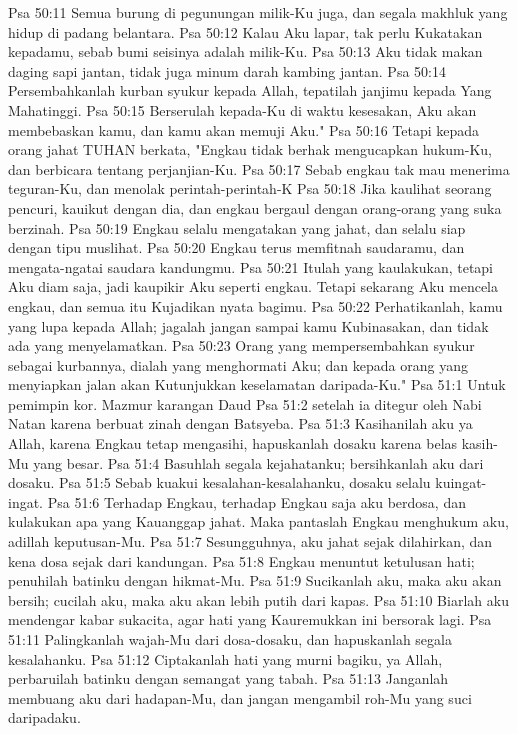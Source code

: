 Psa 50:11  Semua burung di pegunungan milik-Ku juga, dan segala makhluk yang hidup di padang belantara.
Psa 50:12  Kalau Aku lapar, tak perlu Kukatakan kepadamu, sebab bumi seisinya adalah milik-Ku.
Psa 50:13  Aku tidak makan daging sapi jantan, tidak juga minum darah kambing jantan.
Psa 50:14  Persembahkanlah kurban syukur kepada Allah, tepatilah janjimu kepada Yang Mahatinggi.
Psa 50:15  Berserulah kepada-Ku di waktu kesesakan, Aku akan membebaskan kamu, dan kamu akan memuji Aku."
Psa 50:16  Tetapi kepada orang jahat TUHAN berkata, "Engkau tidak berhak mengucapkan hukum-Ku, dan berbicara tentang perjanjian-Ku.
Psa 50:17  Sebab engkau tak mau menerima teguran-Ku, dan menolak perintah-perintah-K
Psa 50:18  Jika kaulihat seorang pencuri, kauikut dengan dia, dan engkau bergaul dengan orang-orang yang suka berzinah.
Psa 50:19  Engkau selalu mengatakan yang jahat, dan selalu siap dengan tipu muslihat.
Psa 50:20  Engkau terus memfitnah saudaramu, dan mengata-ngatai saudara kandungmu.
Psa 50:21  Itulah yang kaulakukan, tetapi Aku diam saja, jadi kaupikir Aku seperti engkau. Tetapi sekarang Aku mencela engkau, dan semua itu Kujadikan nyata bagimu.
Psa 50:22  Perhatikanlah, kamu yang lupa kepada Allah; jagalah jangan sampai kamu Kubinasakan, dan tidak ada yang menyelamatkan.
Psa 50:23  Orang yang mempersembahkan syukur sebagai kurbannya, dialah yang menghormati Aku; dan kepada orang yang menyiapkan jalan akan Kutunjukkan keselamatan daripada-Ku."
Psa 51:1  Untuk pemimpin kor. Mazmur karangan Daud
Psa 51:2  setelah ia ditegur oleh Nabi Natan karena berbuat zinah dengan Batsyeba.
Psa 51:3  Kasihanilah aku ya Allah, karena Engkau tetap mengasihi, hapuskanlah dosaku karena belas kasih-Mu yang besar.
Psa 51:4  Basuhlah segala kejahatanku; bersihkanlah aku dari dosaku.
Psa 51:5  Sebab kuakui kesalahan-kesalahanku, dosaku selalu kuingat-ingat.
Psa 51:6  Terhadap Engkau, terhadap Engkau saja aku berdosa, dan kulakukan apa yang Kauanggap jahat. Maka pantaslah Engkau menghukum aku, adillah keputusan-Mu.
Psa 51:7  Sesungguhnya, aku jahat sejak dilahirkan, dan kena dosa sejak dari kandungan.
Psa 51:8  Engkau menuntut ketulusan hati; penuhilah batinku dengan hikmat-Mu.
Psa 51:9  Sucikanlah aku, maka aku akan bersih; cucilah aku, maka aku akan lebih putih dari kapas.
Psa 51:10  Biarlah aku mendengar kabar sukacita, agar hati yang Kauremukkan ini bersorak lagi.
Psa 51:11  Palingkanlah wajah-Mu dari dosa-dosaku, dan hapuskanlah segala kesalahanku.
Psa 51:12  Ciptakanlah hati yang murni bagiku, ya Allah, perbaruilah batinku dengan semangat yang tabah.
Psa 51:13  Janganlah membuang aku dari hadapan-Mu, dan jangan mengambil roh-Mu yang suci daripadaku.
